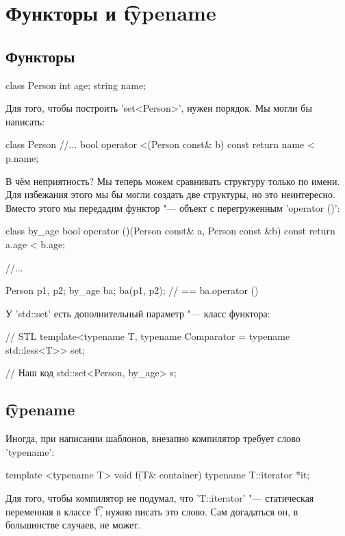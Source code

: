 \chapter{Функторы и \t{typename}}
\section{Функторы}

\begin{cppcode}
class Person {
	int age;
	string name;
}
\end{cppcode}

Для того, чтобы построить \cpp'set<Person>', нужен порядок.
Мы могли бы написать:
\begin{cppcode}
class Person {
	//...
	bool operator <(Person const& b) const {
		return name < p.name;
	}
}
\end{cppcode}

В чём неприятность? Мы теперь можем сравнивать структуру только по имени.
Для избежания этого мы бы могли создать две структуры, но это неинтересно.
Вместо этого мы передадим функтор "--- объект с перегруженным \cpp'operator ()':
\begin{cppcode}
class by_age {
	bool operator ()(Person const& a, Person const &b) const {
		return a.age < b.age;
	}
}

//...

Person p1, p2;
by_age ba;
ba(p1, p2); // == ba.operator ()
\end{cppcode}

У \cpp'std::set' есть дополнительный параметр "--- класс функтора:
\begin{cppcode}
// STL
template<typename T, typename Comparator = typename std::less<T>> set;

// Наш код
std::set<Person, by_age> s;
\end{cppcode}

\section{\t{typename}}

Иногда, при написании шаблонов, внезапно компилятор требует слово \cpp'typename':
\begin{cppcode}
template <typename T>
void f(T& container) {
	typename T::iterator *it;
}
\end{cppcode}
Для того, чтобы компилятор не подумал, что \cpp'T::iterator' "--- статическая переменная в классе \t{T}, нужно писать это слово.
Сам догадаться он, в большинстве случаев, не может.